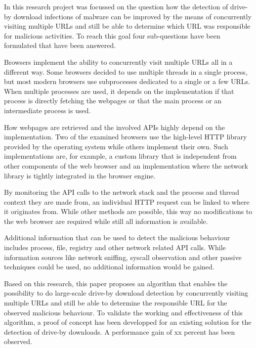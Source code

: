 

In this research project was focussed on the question how the detection of drive-by download infections of malware can be improved by the means of concurrently visiting multiple URLs and still be able to determine which URL was responsible for malicious activities. To reach this goal four sub-questions have been formulated that have been answered.

Browsers implement the ability to concurrently visit multiple URLs all in a different way. Some browsers decided to use multiple threads in a single process, but most modern browsers use subprocesses dedicated to a single or a few URLs. When multiple processes are used, it depends on the implementation if that process is directly fetching the webpages or that the main process or an intermediate process is used.

How webpages are retrieved and the involved APIs highly depend on the implementation. Two of the examined browsers use the high-level HTTP library provided by the operating system while others implement their own. Such implementations are, for example, a custom library that is independent from other components of the web browser and an implementation where the network library is tightly integrated in the browser engine.

By monitoring the API calls to the network stack and the process and thread context they are made from, an individual HTTP request can be linked to where it originates from. While other methods are possible, this way no modifications to the web browser are required while still all information is available.

Additional information that can be used to detect the malicious behaviour includes process, file, registry and other network related API calls. While information sources like network sniffing, syscall observation and other passive techniques could be used, no additional information would be gained.

Based on this research, this paper proposes an algorithm that enables the possibility to do large-scale drive-by download detection by concurrently visiting multiple URLs and still be able to determine the responsible URL for the observed malicious behaviour. To validate the working and effectiveness of this algorithm, a proof of concept has been developped for an existing solution for the detection of drive-by downloads. A performance gain of xx\todo{} percent has been observed.